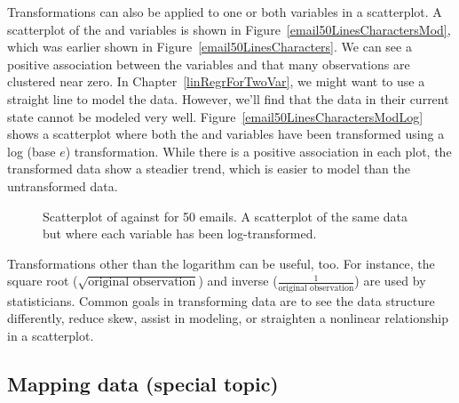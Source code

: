 Transformations can also be applied to one or both variables in a scatterplot. A scatterplot of the  and  variables is shown in Figure~\ref{email50LinesCharactersMod}, which was earlier shown in Figure~\ref{email50LinesCharacters}. We can see a positive association between the variables and that many observations are clustered near zero. In Chapter~\ref{linRegrForTwoVar}, we might want to use a straight line to model the data. However, we'll find that the data in their current state cannot be modeled very well. Figure~\ref{email50LinesCharactersModLog} shows a scatterplot where both the  and  variables have been transformed using a log (base $e$) transformation. While there is a positive association in each plot, the transformed data show a steadier trend, which is easier to model than the untransformed data.

\begin{figure}
\centering
{}
\caption{ Scatterplot of  against  for 50 emails.  A scatterplot of the same data but where each variable has been log-transformed.}
\label{email50LinesCharactersModMain}
\end{figure}

Transformations other than the logarithm can be useful, too. For instance, the square root ($\sqrt{\text{original observation}}$) and inverse ($\frac{1}{\text{original observation}}$) are used by statisticians. Common goals in transforming data are to see the data structure differently, reduce skew, assist in modeling, or straighten a nonlinear relationship in a scatterplot.


\subsection{Mapping data (special topic)}

